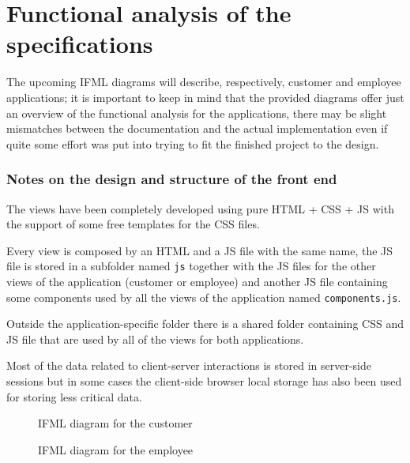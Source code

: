 
\chapter{Functional analysis of the specifications}

The upcoming IFML diagrams will describe, respectively, customer and employee applications; it is important to keep in mind that the provided diagrams offer just an overview of the functional analysis for the applications, there may be slight mismatches between the documentation and the actual implementation even if quite some effort was put into trying to fit the finished project to the design.

\subsection*{Notes on the design and structure of the front end}

The views have been completely developed using pure HTML + CSS + JS with the support of some free templates for the CSS files. 

Every view is composed by an HTML and a JS file with the same name, the JS file is stored in a subfolder named \texttt{js} together with the JS files for the other views of the application (customer or employee) and another JS file containing some components used by all the views of the application named \texttt{components.js}. 

Outside the application-specific folder there is a shared folder containing CSS and JS file that are used by all of the views for both applications.

Most of the data related to client-server interactions is stored in server-side sessions but in some cases the client-side browser local storage has also been used for storing less critical data.

\begin{landscape}
    \thispagestyle{landscape}
    \begin{figure}[!htbp]
        \vspace*{-2\oddsidemargin}
        \centerline{}
        \caption{IFML diagram for the customer}
        \label{fig:ifml_diagram_customer}
        \vspace{-100pt}
    \end{figure}
\end{landscape}

\begin{landscape}
    \thispagestyle{landscape}
    \begin{figure}[p]
        \vspace*{-2\oddsidemargin}
        \centerline{}
        \caption{IFML diagram for the employee}
        \label{fig:ifml_diagram_employee}
    \end{figure}
\end{landscape}